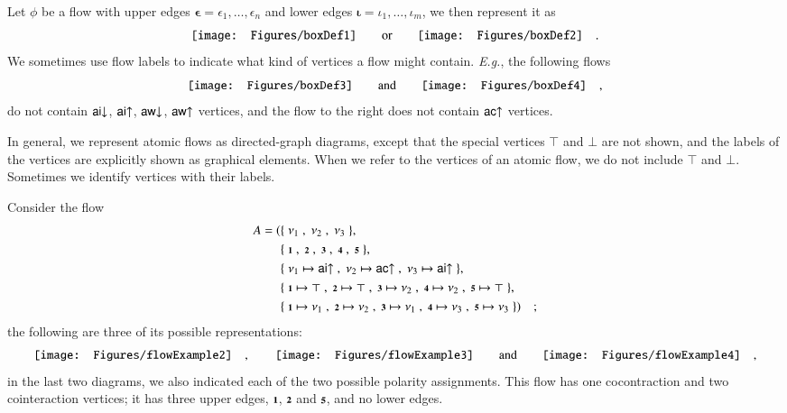 \begin{notation}\label{notation:LabelsOnBoxes}
Let $\phi$ be a flow with upper edges $\boldsymbol\epsilon=\epsilon_1,\dots,\epsilon_n$ and lower edges $\boldsymbol\iota=\iota_1,\dots,\iota_m$, we then represent it as
\[
\vcenter{\hbox{\texttt{[image: Figures/boxDef1]}}}
\qquad\mbox{or}\qquad
\vcenter{\hbox{\texttt{[image: Figures/boxDef2]}}}
\quad.
\]
We sometimes use flow labels to indicate what kind of vertices a flow might contain. \emph{E.g.}, the following flows
\[
\vcenter{\hbox{\texttt{[image: Figures/boxDef3]}}}
\qquad\mbox{and}\qquad
\vcenter{\hbox{\texttt{[image: Figures/boxDef4]}}}
\quad,
\]
do not contain ${{\mathsf{ai}}{\downarrow}}$, ${{\mathsf{ai}}{\uparrow}}$, ${{\mathsf{aw}}{\downarrow}}$, ${{\mathsf{aw}}{\uparrow}}$ vertices, and the flow to the right does not contain ${{\mathsf{ac}}{\uparrow}}$ vertices.

In general, we represent atomic flows as directed-graph diagrams, except that the special vertices $\top$ and $\bot$ are not shown, and the labels of the vertices are explicitly shown as graphical elements. When we refer to the vertices of an atomic flow, we do not include $\top$ and $\bot$. Sometimes we identify vertices with their labels. 
\end{notation}

\begin{example}
Consider the flow
\begin{align*}
A=(&\{\;\nu_1\;,\;\nu_2\;,\;\nu_3\;\},\\
   &\{\;\one\;,\;\two\;,\;\three\;,\;\four\;,\;\five\;\},\\
   &\{\;\nu_1\mapsto\aiu\;,\;\nu_2\mapsto\acu\;,\;\nu_3\mapsto\aiu\;\},\\
   &\{\;\one\mapsto\top\;,\;\two\mapsto\top\;,\;\three\mapsto\nu_2\;,\;
        \four\mapsto\nu_2\;,\;\five\mapsto\top\;\},\\
   &\{\;\one\mapsto\nu_1\;,\;\two\mapsto\nu_2\;,\;\three\mapsto\nu_1\;,\;
        \four\mapsto\nu_3\;,\;\five\mapsto\nu_3\;\})
\quad;
\end{align*}
the following are three of its possible representations:
\[
\vcenter{\hbox{\texttt{[image: Figures/flowExample2]}}}
\quad,\qquad
\vcenter{\hbox{\texttt{[image: Figures/flowExample3]}}}
\qquad\hbox{and}\qquad
\vcenter{\hbox{\texttt{[image: Figures/flowExample4]}}}
\quad,
\]
in the last two diagrams, we also indicated each of the two possible polarity assignments. This flow has one cocontraction and two cointeraction vertices; it has three upper edges, $\one$, $\two$ and $\five$, and no lower edges.
\end{example}

